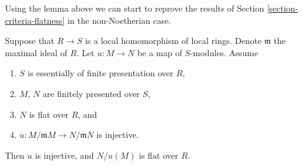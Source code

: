 \noindent
Using the lemma above we can start to reprove the results of
Section \ref{section-criteria-flatness}
in the non-Noetherian case.

\begin{lemma}
\label{lemma-mod-injective-general}
Suppose that $R \to S$ is a local homomorphism of local rings.
Denote $\mathfrak m$ the maximal ideal of $R$.
Let $u : M \to N$ be a map of $S$-modules.
Assume
\begin{enumerate}
\item $S$ is essentially of finite presentation over $R$,
\item $M$, $N$ are finitely presented over $S$,
\item $N$ is flat over $R$, and
\item $\overline{u} : M/\mathfrak mM \to N/\mathfrak mN$ is injective.
\end{enumerate}
Then $u$ is injective, and $N/u(M)$ is flat over $R$.
\end{lemma}

